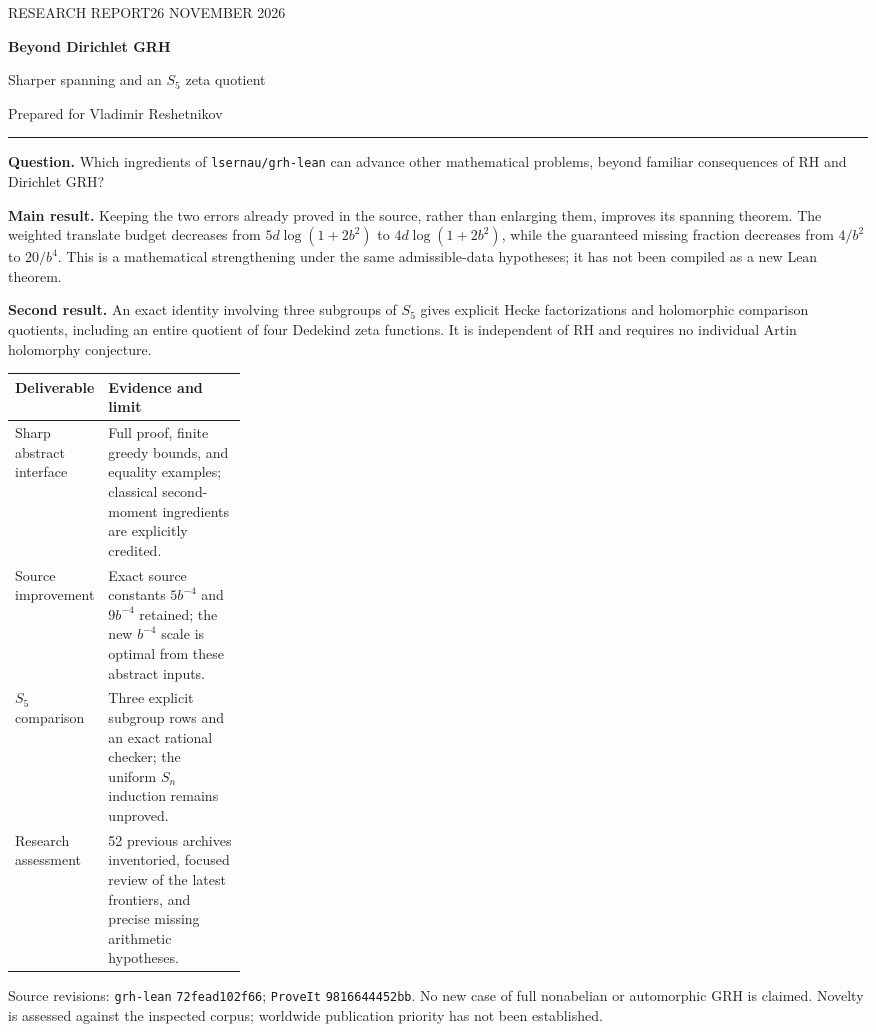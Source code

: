 \documentclass[11pt,letterpaper]{article}
\theoremstyle{definition}
\begin{document}
\hypersetup{pageanchor=false}
\begin{titlepage}\thispagestyle{empty}
{\sffamily\large\color{teal}RESEARCH REPORT\hfill 26 NOVEMBER 2026\par}
\vspace{1cm}
{\fontsize{29}{35}\selectfont\bfseries\color{navy}Beyond Dirichlet GRH\par}
\vspace{0.35cm}
{\Large Sharper spanning and an $S_5$ zeta quotient\par}
\vspace{0.7cm}
{\large Prepared for Vladimir Reshetnikov\par}
\vspace{0.7cm}\hrule\vspace{0.55cm}
\textbf{Question.} Which ingredients of \texttt{lsernau/grh-lean} can advance
other mathematical problems, beyond familiar consequences of RH and Dirichlet GRH?

\textbf{Main result.} Keeping the two errors already proved in the source,
rather than enlarging them, improves its spanning theorem. The weighted
translate budget decreases from $5d\log(1+2b^2)$ to $4d\log(1+2b^2)$,
while the guaranteed missing fraction decreases from $4/b^2$ to $20/b^4$.
This is a mathematical strengthening under the same admissible-data hypotheses;
it has not been compiled as a new Lean theorem.

\textbf{Second result.} An exact identity involving three subgroups of $S_5$
gives explicit Hecke factorizations and holomorphic comparison quotients,
including an entire quotient of four Dedekind zeta functions.
It is independent of RH and requires no individual Artin holomorphy conjecture.

\begin{tabularx}{\linewidth}{@{}p{0.27\linewidth}X@{}}
\toprule
\textbf{Deliverable} & \textbf{Evidence and limit}\\
\midrule
Sharp abstract interface & Full proof, finite greedy bounds, and equality examples;
classical second-moment ingredients are explicitly credited.\\
Source improvement & Exact source constants $5b^{-4}$ and $9b^{-4}$ retained;
the new $b^{-4}$ scale is optimal from these abstract inputs.\\
$S_5$ comparison & Three explicit subgroup rows and an exact rational checker;
the uniform $S_n$ induction remains unproved.\\
Research assessment & 52 previous archives inventoried, focused review of the
latest frontiers, and precise missing arithmetic hypotheses.\\
\bottomrule
\end{tabularx}
\vfill
{\small\color{muted}
Source revisions: \texttt{grh-lean} \texttt{72fead102f66};
\texttt{ProveIt} \texttt{9816644452bb}. No new case of full nonabelian or
automorphic GRH is claimed. Novelty is assessed against the inspected corpus;
worldwide publication priority has not been established.\par}
\end{titlepage}
\end{document}
